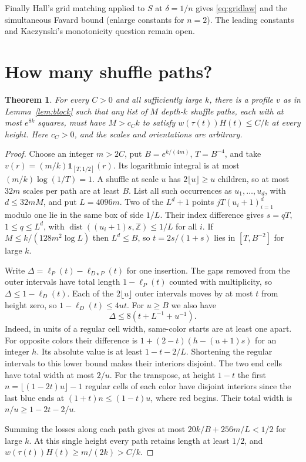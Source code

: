 \documentclass[11pt,reqno]{amsart}
\newtheorem{theorem}{Theorem}
\begin{document}
Finally Hall's grid matching applied to $S$ at $\delta=1/n$ gives \eqref{eq:gridlaw} and the simultaneous Favard bound (enlarge constants for $n=2$). The leading constants and Kaczynski's monotonicity question remain open.

\section{How many shuffle paths?}

\begin{theorem}\label{thm:paths}
For every $C>0$ and all sufficiently large $k$, there is a profile $v$ as in Lemma~\ref{lem:block} such that any list of $M$ depth-$k$ shuffle paths, each with at most $e^{8k}$ squares, must have $M>c_C k$ to satisfy $w(\tau(t))H(t)\le C/k$ at every height. Here $c_C>0$, and the scales and orientations are arbitrary.
\end{theorem}
\begin{proof}
Choose an integer $m>2C$, put $B=e^{k/(4m)}$, $T=B^{-4}$, and take $v(r)=(m/k)\mathbf1_{[T,1/2]}(r)$. Its logarithmic integral is at most $(m/k)\log(1/T)=1$. A shuffle at scale $u$ has $2\lfloor u\rfloor\ge u$ children, so at most $32m$ scales per path are at least $B$. List all such occurrences as $u_1,\ldots,u_d$, with $d\le32mM$, and put $L=4096m$. Two of the $L^d+1$ points $jT(u_i+1)_{i=1}^d$ modulo one lie in the same box of side $1/L$. Their index difference gives $s=qT$, $1\le q\le L^d$, with $\operatorname{dist}((u_i+1)s,\mathbb Z)\le1/L$ for all $i$. If $M\le k/(128m^2\log L)$ then $L^d\le B$, so $t=2s/(1+s)$ lies in $[T,B^{-2}]$ for large $k$.

Write $\Delta=\ell_P(t)-\ell_{D\star P}(t)$ for one insertion. The gaps removed from the outer intervals have total length $1-\ell_P(t)$ counted with multiplicity, so $\Delta\le1-\ell_D(t)$. Each of the $2\lfloor u\rfloor$ outer intervals moves by at most $t$ from height zero, so $1-\ell_D(t)\le4ut$. For $u\ge B$ we also have
\[
 \Delta\le 8(t+L^{-1}+u^{-1}).
\]
Indeed, in units of a regular cell width, same-color starts are at least one apart. For opposite colors their difference is $1+(2-t)(h-(u+1)s)$ for an integer $h$. Its absolute value is at least $1-t-2/L$. Shortening the regular intervals to this lower bound makes their interiors disjoint. The two end cells have total width at most $2/u$. For the transpose, at height $1-t$ the first $n=\lfloor(1-2t)u\rfloor-1$ regular cells of each color have disjoint interiors since the last blue ends at $(1+t)n\le(1-t)u$, where red begins. Their total width is $n/u\ge1-2t-2/u$.

Summing the losses along each path gives at most $20k/B+256m/L<1/2$ for large $k$. At this single height every path retains length at least $1/2$, and $w(\tau(t))H(t)\ge m/(2k)>C/k$.
\end{proof}
\end{document}
